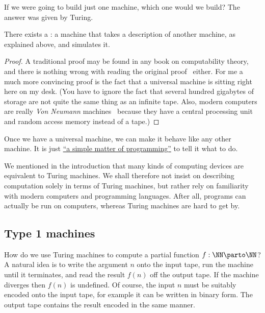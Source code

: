 If we were going to build just one machine, which one would we build?
The answer was given by Turing.

\begin{theorem}[Turing]
  \label{thm:universal-machine}
  There exists a : a machine that takes a
  description of another machine, as explained above, and simulates
  it.
\end{theorem}

\begin{proof}
  A traditional proof may be found in any book on computability
  theory, and there is nothing wrong with reading the original
  proof~ either.
  For me a much more convincing proof is the fact that a universal
  machine is sitting right here on my desk. (You have to
    ignore the fact that several hundred gigabytes of storage are not
    quite the same thing as an infinite tape. Also, modern computers
    are really \emph{Von Neumann}
    machines~ because
    they have a central processing unit and random access memory
    instead of a tape.)
\end{proof}

Once we have a universal machine, we can make it behave like any other
machine. It is just
\href{http://www.catb.org/jargon/html/S/SMOP.html}{``a simple matter
  of programming''} to tell it what to do.

We mentioned in the introduction that many kinds of computing devices
are equivalent to Turing machines. We shall therefore not insist on
describing computation solely in terms of Turing machines, but rather
rely on familiarity with modern computers and programming languages.
After all, programs can actually be run on computers, whereas Turing
machines are hard to get by.


\subsection{Type 1 machines}
\label{sec:type-1}

How do we use Turing machines to compute a partial function $f :
\NN \parto \NN$? A natural idea is to write the argument $n$ onto the
input tape, run the machine until it terminates, and read the result
$f(n)$ off the output tape. If the machine diverges then $f(n)$ is
undefined. Of course, the input $n$ must be suitably encoded onto the
input tape, for example it can be written in binary form. The output
tape contains the result encoded in the same manner.

